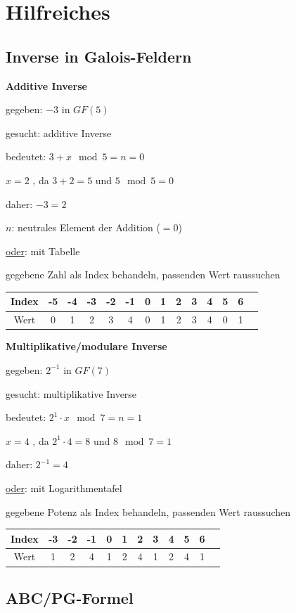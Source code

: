 \appendix

\section{Hilfreiches}

\subsection{Inverse in Galois-Feldern}

\textbf{Additive Inverse}

gegeben: $-3$ in $GF(5)$

gesucht: additive Inverse

bedeutet: $3 + x \mod 5 = n = 0$

$x = 2$ , da $3 + 2 = 5$ und $5 \mod 5 = 0$

daher: $-3 = 2$

$n$: neutrales Element der Addition ($=0$)

\underline{oder}: mit Tabelle

gegebene Zahl als Index behandeln, passenden Wert raussuchen

\begin{tabular}{ c | c | c | c | c | c | c | c | c | c | c | c | c | c | }
    Index & -5 & -4 & -3 & -2 & -1 & 0 & 1 & 2 & 3 & 4 & 5 & 6\\
    \hline
    Wert  & 0 &  1 &  2 &  3 &  4  & 0 & 1 & 2 & 3 & 4 & 0 & 1
\end{tabular}

\textbf{Multiplikative/modulare Inverse}

gegeben: $2^{-1}$ in $GF(7)$

gesucht: multiplikative Inverse

bedeutet: $2^{1} \cdot x \mod 7 = n = 1$

$x = 4$ , da $2^{1} \cdot 4 = 8$ und $8 \mod 7 = 1$

daher: $2^{-1} = 4$

\underline{oder}: mit Logarithmentafel

gegebene Potenz als Index behandeln, passenden Wert raussuchen

\begin{tabular}{ c | c | c | c | c | c | c | c | c | c | c | c | }
    Index  & -3 & -2 & -1 & 0 & 1 & 2 & 3 & 4 & 5 & 6\\
    \hline
    Wert   &  1 &  2 &  4 & 1 & 2 & 4 & 1 & 2 & 4 & 1
\end{tabular}

\subsection{ABC/PG-Formel}

